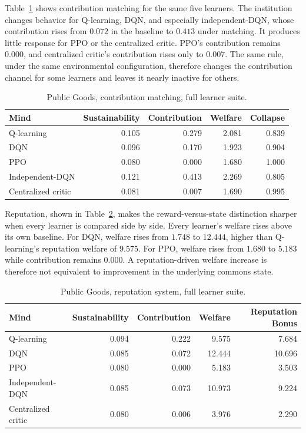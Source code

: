 \documentclass[11pt]{article}
\begin{document}
Table~\ref{tab:public-goods-matching-crossmind} shows contribution matching for
the same five learners. The institution changes behavior for Q-learning, DQN,
and especially independent-DQN, whose contribution rises from \(0.072\) in the
baseline to \(0.413\) under matching. It produces little response for PPO or the
centralized critic. PPO's contribution remains \(0.000\), and centralized
critic's contribution rises only to \(0.007\). The same rule, under the same
environmental configuration, therefore changes the contribution channel for some
learners and leaves it nearly inactive for others.

\begin{table}[h]
\centering
\begin{tabular}{lrrrr}
\toprule
Mind & Sustainability & Contribution & Welfare & Collapse \\
\midrule
Q-learning & 0.105 & 0.279 & 2.081 & 0.839 \\
DQN & 0.096 & 0.170 & 1.923 & 0.904 \\
PPO & 0.080 & 0.000 & 1.680 & 1.000 \\
Independent-DQN & 0.121 & 0.413 & 2.269 & 0.805 \\
Centralized critic & 0.081 & 0.007 & 1.690 & 0.995 \\
\bottomrule
\end{tabular}
\caption{Public Goods, contribution matching, full learner suite.}
\label{tab:public-goods-matching-crossmind}
\end{table}

Reputation, shown in Table~\ref{tab:public-goods-reputation-crossmind}, makes
the reward-versus-state distinction sharper when every learner is compared side
by side. Every learner's welfare rises above its own baseline. For DQN, welfare
rises from \(1.748\) to \(12.444\), higher than Q-learning's reputation welfare
of \(9.575\). For PPO, welfare rises from \(1.680\) to \(5.183\) while
contribution remains \(0.000\). A reputation-driven welfare increase is
therefore not equivalent to improvement in the underlying commons state.

\begin{table}[h]
\centering
\begin{tabular}{lrrrr}
\toprule
Mind & Sustainability & Contribution & Welfare & Reputation Bonus \\
\midrule
Q-learning & 0.094 & 0.222 & 9.575 & 7.684 \\
DQN & 0.085 & 0.072 & 12.444 & 10.696 \\
PPO & 0.080 & 0.000 & 5.183 & 3.503 \\
Independent-DQN & 0.085 & 0.073 & 10.973 & 9.224 \\
Centralized critic & 0.080 & 0.006 & 3.976 & 2.290 \\
\bottomrule
\end{tabular}
\caption{Public Goods, reputation system, full learner suite.}
\label{tab:public-goods-reputation-crossmind}
\end{table}
\end{document}
